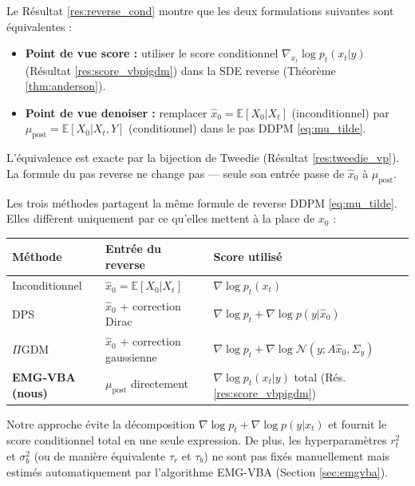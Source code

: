 \documentclass[12pt]{article}
\begin{document}
\begin{remarkbox}
Le Résultat \ref{res:reverse_cond} montre que les deux formulations suivantes sont équivalentes :
\begin{itemize}
\item \textbf{Point de vue score :} utiliser le score conditionnel $\nabla_{x_t} \log p_t(x_t | y)$ (Résultat \ref{res:score_vbpigdm}) dans la SDE reverse (Théorème \ref{thm:anderson}).
\item \textbf{Point de vue denoiser :} remplacer $\hat{x}_0 = \mathbb{E}[X_0 | X_t]$ (inconditionnel) par $\mu_{\text{post}} = \mathbb{E}[X_0 | X_t, Y]$ (conditionnel) dans le pas DDPM \eqref{eq:mu_tilde}.
\end{itemize}
L'équivalence est exacte par la bijection de Tweedie (Résultat \ref{res:tweedie_vp}). La formule du pas reverse ne change pas --- seule son entrée passe de $\hat{x}_0$ à $\mu_{\text{post}}$.
\end{remarkbox}

\begin{remarkbox}
Les trois méthodes partagent la même formule de reverse DDPM \eqref{eq:mu_tilde}. Elles diffèrent uniquement par ce qu'elles mettent à la place de $x_0$ :

\medskip
\begin{center}
\renewcommand{\arraystretch}{1.4}
\begin{tabular}{lll}
\toprule
\textbf{Méthode} & \textbf{Entrée du reverse} & \textbf{Score utilisé} \\
\midrule
Inconditionnel & $\hat{x}_0 = \mathbb{E}[X_0 | X_t]$ & $\nabla \log p_t(x_t)$ \\
DPS & $\hat{x}_0$ + correction Dirac & $\nabla \log p_t + \nabla \log p(y | \hat{x}_0)$ \\
$\Pi$GDM & $\hat{x}_0$ + correction gaussienne & $\nabla \log p_t + \nabla \log \mathcal{N}(y; A\hat{x}_0, \Sigma_y)$ \\
\textbf{EMG-VBA (nous)} & $\mu_{\text{post}}$ directement & $\nabla \log p_t(x_t | y)$ total (Rés. \ref{res:score_vbpigdm}) \\
\bottomrule
\end{tabular}
\end{center}

\medskip
Notre approche évite la décomposition $\nabla \log p_t + \nabla \log p(y|x_t)$ et fournit le score conditionnel total en une seule expression. De plus, les hyperparamètres $r_t^2$ et $\sigma_b^2$ (ou de manière équivalente $\tau_r$ et $\tau_b$) ne sont pas fixés manuellement mais estimés automatiquement par l'algorithme EMG-VBA (Section \ref{sec:emgvba}).
\end{remarkbox}
\end{document}
